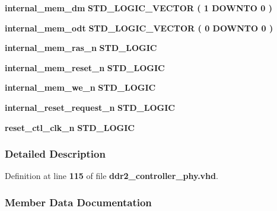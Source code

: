 \begin{DoxyCompactItemize}
\item 
{\bf internal\+\_\+mem\+\_\+dm} {\bfseries \textcolor{comment}{S\+T\+D\+\_\+\+L\+O\+G\+I\+C\+\_\+\+V\+E\+C\+T\+OR}\textcolor{vhdlchar}{ }\textcolor{vhdlchar}{(}\textcolor{vhdlchar}{ }\textcolor{vhdlchar}{ } \textcolor{vhdldigit}{1} \textcolor{vhdlchar}{ }\textcolor{keywordflow}{D\+O\+W\+N\+TO}\textcolor{vhdlchar}{ }\textcolor{vhdlchar}{ } \textcolor{vhdldigit}{0} \textcolor{vhdlchar}{ }\textcolor{vhdlchar}{)}\textcolor{vhdlchar}{ }} 
\item 
{\bf internal\+\_\+mem\+\_\+odt} {\bfseries \textcolor{comment}{S\+T\+D\+\_\+\+L\+O\+G\+I\+C\+\_\+\+V\+E\+C\+T\+OR}\textcolor{vhdlchar}{ }\textcolor{vhdlchar}{(}\textcolor{vhdlchar}{ }\textcolor{vhdlchar}{ } \textcolor{vhdldigit}{0} \textcolor{vhdlchar}{ }\textcolor{keywordflow}{D\+O\+W\+N\+TO}\textcolor{vhdlchar}{ }\textcolor{vhdlchar}{ } \textcolor{vhdldigit}{0} \textcolor{vhdlchar}{ }\textcolor{vhdlchar}{)}\textcolor{vhdlchar}{ }} 
\item 
{\bf internal\+\_\+mem\+\_\+ras\+\_\+n} {\bfseries \textcolor{comment}{S\+T\+D\+\_\+\+L\+O\+G\+IC}\textcolor{vhdlchar}{ }} 
\item 
{\bf internal\+\_\+mem\+\_\+reset\+\_\+n} {\bfseries \textcolor{comment}{S\+T\+D\+\_\+\+L\+O\+G\+IC}\textcolor{vhdlchar}{ }} 
\item 
{\bf internal\+\_\+mem\+\_\+we\+\_\+n} {\bfseries \textcolor{comment}{S\+T\+D\+\_\+\+L\+O\+G\+IC}\textcolor{vhdlchar}{ }} 
\item 
{\bf internal\+\_\+reset\+\_\+request\+\_\+n} {\bfseries \textcolor{comment}{S\+T\+D\+\_\+\+L\+O\+G\+IC}\textcolor{vhdlchar}{ }} 
\item 
{\bf reset\+\_\+ctl\+\_\+clk\+\_\+n} {\bfseries \textcolor{comment}{S\+T\+D\+\_\+\+L\+O\+G\+IC}\textcolor{vhdlchar}{ }} 
\end{DoxyCompactItemize}


\subsubsection{Detailed Description}


Definition at line {\bf 115} of file {\bf ddr2\+\_\+controller\+\_\+phy.\+vhd}.



\subsubsection{Member Data Documentation}

